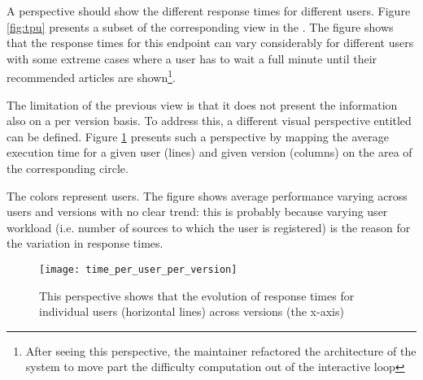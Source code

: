 A  perspective should show the different response times for different users. Figure \ref{fig:tpu} presents a subset of the corresponding view in the \tool. The figure shows that the response times for this endpoint can vary considerably for different users with some extreme cases where a user has to wait a full minute until their recommended articles are shown\footnote{After seeing this perspective, the maintainer refactored the architecture of the system to move part the difficulty computation out of the interactive loop}.



The limitation of the previous view is that it does not present the information also on a per version basis. To address this, a different visual perspective entitled  can be defined. Figure \ref{fig:tuv} presents such a perspective by mapping the average execution time for a given user (lines) and given version (columns) on the area of the corresponding circle. 


The colors represent users. The figure shows average performance varying  across users and versions with no clear trend: this is probably because varying user workload (i.e. number of sources to which the user is registered) is the reason for the variation in response times. 

\begin{figure}[!ht]
  \centering
  \texttt{[image: time\_per\_user\_per\_version]}
  \caption{This perspective shows that the evolution of response times for individual users (horizontal lines) across versions (the x-axis)}
  \label{fig:tuv}
\end{figure}



